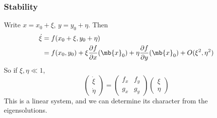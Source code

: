 \documentclass[a4paper]{article}
\begin{document}
\subsubsection{Stability}
Write $x = x_0 + \xi$, $y = y_0 + \eta$. Then
\begin{align*}
  \dot \xi &= f(x_0 + \xi, y_0 + \eta)\\
  &= f(x_0, y_0)+ \xi \frac{\partial f}{\partial x}(\mb{x}_0) + \eta \frac{\partial f}{\partial y}(\mb{x}_0) + O(\xi^2, \eta^2)
\end{align*}
So if $\xi, \eta \ll 1$, 
\[
\begin{pmatrix}
  \dot \xi\\\dot \eta
\end{pmatrix} = 
\begin{pmatrix}
  f_x & f_y\\
  g_x & g_y
\end{pmatrix}
\begin{pmatrix}
  \xi\\\eta
\end{pmatrix}
\]
This is a linear system, and we can determine its character from the eigensolutions. 
\end{document}
